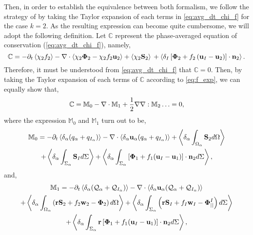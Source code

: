 Then, in order to establish the equivalence between both formalism, we follow the strategy of \citep{lhuillier2000bilan} by taking the Taylor expansion of each terms in \ref{eq:avg_dt_chi_f} for the case $k=2$. 
As the resulting expression can become quite cumbersome, we will adopt the following definition. 
Let $\mathbb{C}$ represent the phase-averaged equation of conservation (\ref{eq:avg_dt_chi_f}), namely, 
\begin{equation*}
    \mathbb{C}
    =
    - \partial_t \left<\chi_2f_2\right>
    - \mathbf{\nabla} \cdot \left<\chi_2 \mathbf{\Phi}_2 - \chi_2f_2 \textbf{u}_2\right>
    + \left<\chi_2 \textbf{S}_2\right>\\
    + \left<\delta_I\left[
        \mathbf{\Phi}_2
        + f_2
        \left(
            \textbf{u}_I
            - \textbf{u}_2
        \right)
    \right]
    \cdot \textbf{n}_2\right>. 
\end{equation*}
Therefore, it must be understood from \ref{eq:avg_dt_chi_f} that $\mathbb{C}=0$.
Then, by taking the Taylor expansion of each terms of $\mathbb{C}$ according to \ref{eq:f_exp}, we can equally show that,
\begin{equation}
    \mathbb{C} = \mathbb{M}_0 - \mathbf{\nabla} \cdot \mathbb{M}_1 + \frac{1}{2} \mathbf{\nabla}\mathbf{\nabla} : \mathbb{M}_2 \ldots = 0,
    \label{eq:scheme_equivalence}
\end{equation} 
where the expression $\mathbb{M}_0$ and $\mathbb{M}_1$ turn out to be, 
\begin{multline*}
    \mathbb{M}_0
    = 
    - \partial_t \left<\delta_\alpha (q_\alpha+q_{I_\alpha})\right>
    - \mathbf{\nabla} \cdot \left<\delta_\alpha\textbf{u}_\alpha(q_\alpha+q_{I_\alpha})\right>
    + \left<\delta_\alpha\int_{\Omega_\alpha} \textbf{S}_2 d\Omega\right>\\
    + \left<\delta_\alpha\int_{\Sigma_\alpha} \textbf{S}_I d\Sigma\right>
    + \left<\delta_\alpha\int_{\Sigma_\alpha} \left[\mathbf{\Phi}_1 + f_1 (\textbf{u}_I-\textbf{u}_1) \right] \cdot \textbf{n}_2 d\Sigma\right>,
\end{multline*}
and,
\begin{multline*}
    \mathbb{M}_1 =
    - \partial_t \left<\delta_\alpha (\mathcal{Q}_\alpha+\mathcal{Q}_{I_\alpha})\right>
    - \mathbf{\nabla} \cdot \left<\delta_\alpha\textbf{u}_\alpha(\mathcal{Q}_\alpha+\mathcal{Q}_{I_\alpha})\right>
    \\ + \left<\delta_\alpha\int_{\Omega_\alpha} \left(
        \textbf{r} \textbf{S}_2         
        + f_2  \textbf{w}_2 
        - \mathbf{\Phi}_2
    \right) d\Omega\right>
    + \left<\delta_\alpha\int_{\Sigma_\alpha} \left(
        \textbf{r}\textbf{S}_I
        + f_I \textbf{w}_I
        - \mathbf{\Phi}_{||}^I
    \right) d\Sigma\right>\\
    + \left<\delta_\alpha\int_{\Sigma_\alpha} \textbf{r} \left[
        \mathbf{\Phi}_1
        + f_1 (\textbf{u}_I-\textbf{u}_1)
    \right]\cdot \textbf{n}_2  d\Sigma\right>,
\end{multline*}
